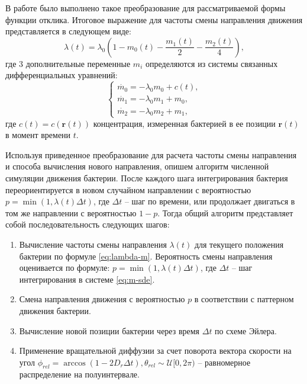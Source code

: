 В работе \cite{celani_bacterial_2010} было выполнено такое преобразование для рассматриваемой формы функции отклика. Итоговое выражение для частоты смены направления движения представляется в следующем виде:
\begin{equation}
	\lambda(t) = \lambda_0 \left (1 - m_0(t) - \frac{m_1(t)}{2} - \frac{m_2(t)}{4} \right ),
	\label{eq:lambda-m}
\end{equation}
где 3 дополнительные переменные $m_i$ определяются из системы связанных дифференциальных уравнений:
\begin{equation}
	\begin{cases}
		\dot{m_0} = -\lambda_0 m_0 + c(t), \\
		\dot{m_1} = -\lambda_0 m_1 + m_0, \\
		\dot{m_2} = -\lambda_0 m_2 + m_1,
	\end{cases}
    \label{eq:m-sde}
\end{equation}
где $c(t) = c(\textbf{r}(t))$ концентрация, измеренная бактерией в ее позиции $\textbf{r}(t)$ в момент времени $t$. 

Используя приведенное преобразование для расчета частоты смены направления и способа вычисления нового направления, опишем алгоритм численной симуляции движения бактерии.  После каждого шага интегрирования бактерия переориентируется в новом случайном направлении с вероятностью $p = \min (1, \lambda(t) \Delta t)$, где $\Delta t$ -- шаг по времени, или продолжает двигаться в том же направлении с вероятностью $1-p$. Тогда общий алгоритм представляет собой последовательность следующих шагов:
\begin{enumerate}
	\item Вычисление частоты смены направления $\lambda(t)$ для текущего положения бактерии по формуле \cref{eq:lambda-m}. Вероятность смены направления оценивается по формуле: $p = \min (1, \lambda(t) \Delta t)$, где $\Delta t$ -- шаг интегрирования в системе \cref{eq:m-sde}. 
    \item Смена направления движения с вероятностью $p$ в соответствии с паттерном движения бактерии.
	\item Вычисление новой позиции бактерии через время $\Delta t$ по схеме Эйлера.
	\item Применение вращательной диффузии за счет поворота вектора скорости на угол $\phi_{rel} =\arccos{(1 - 2 D_r \Delta t)}, \theta_{rel} \sim \mathcal{U}[0, 2\pi)$ -- равномерное распределение на полуинтервале.
\end{enumerate}

